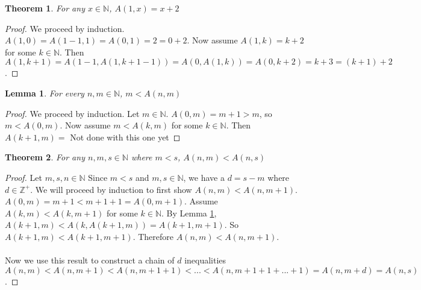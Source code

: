 \documentclass[12pt, letterpaper]{article}
\newtheorem{theorem}{Theorem}
\newtheorem{lemma}{Lemma}
\theoremstyle{case}
\begin{document}
    \begin{theorem}
      \label{x+2=A(1,x)}
      For any $x \in \mathbb{N}$, $A(1, x) = x + 2$
    \end{theorem}
    \begin{proof}
      We proceed by induction. \\
      $A(1, 0) = A(1 - 1, 1) = A(0, 1) = 2 = 0 + 2$. Now assume $A(1, k) = k + 2$ for some $k \in \mathbb{N}$.
      Then $A(1, k + 1) = A(1 - 1, A(1, k + 1 - 1)) = A(0, A(1, k)) = A(0, k + 2) = k + 3 = (k + 1) + 2$.
    \end{proof}

    \begin{lemma}
      \label{m<A(n,m)}
      For every $n, m \in \mathbb{N}$, $m < A(n, m)$
    \end{lemma}
    \begin{proof}
      We proceed by induction.
      Let $m \in \mathbb{N}$.
      $A(0, m) = m + 1 > m$, so $m < A(0, m)$.
      Now assume $m < A(k, m)$ for some $k \in \mathbb{N}$.
      Then $A(k + 1, m) = $
      Not done with this one yet
    \end{proof}

    \begin{theorem}
      \label{a(n,m)<a(n,s)}
      For any $n, m, s \in \mathbb{N}$ where $m < s$, $A(n, m) < A(n, s)$
    \end{theorem}
    \begin{proof}
      Let $m, s, n \in \mathbb{N}$
      Since $m < s$ and $m, s \in \mathbb{N}$, we have a $d = s - m$ where $d \in \mathbb{Z}^+$.
      We will proceed by induction to first show $A(n, m) < A(n, m + 1)$.
      $A(0, m) = m + 1 < m + 1 + 1 = A(0, m + 1)$.
      Assume $A(k, m) < A(k, m + 1)$ for some $k \in \mathbb{N}$.
      By Lemma \ref{m<A(n,m)}, $A(k + 1, m) < A(k, A(k + 1, m)) = A(k + 1, m + 1)$.
      So $A(k + 1, m) < A(k + 1, m + 1)$.
      Therefore $A(n, m) < A(n, m + 1)$.
      \\
      \\
      Now we use this result to construct a chain of $d$ inequalities $A(n, m) < A(n, m + 1) < A(n, m + 1 + 1) < ... < A(n, m + 1 + 1 + ... + 1)
      = A(n, m + d) = A(n, s)$. 
    \end{proof}

\end{document}
